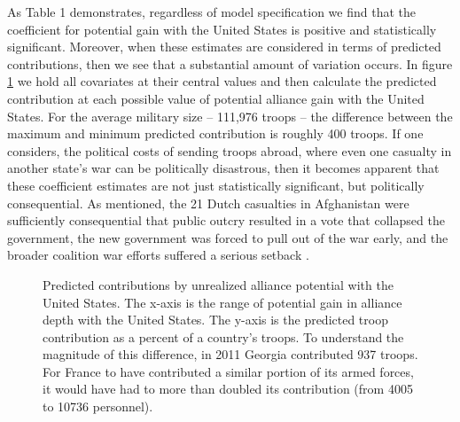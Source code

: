 \documentclass[12pt,letterpaper]{article}
\begin{document}
		\newpage
		
		\newpage

		As Table 1 demonstrates, regardless of model specification we find that the coefficient for potential gain with the United States is positive and statistically significant. Moreover, when these estimates are considered in terms of predicted contributions, then we see that a substantial amount of variation occurs. In figure \ref{fig:predict} we hold all covariates at their central values and then calculate the predicted contribution at each possible value of potential alliance gain with the United States. For the average military size -- 111,976 troops -- the difference between the maximum and minimum predicted contribution is roughly 400 troops. If one considers, the political costs of sending troops abroad, where even one casualty in another state's war can be politically disastrous, then it becomes apparent that these coefficient estimates are not just statistically significant, but politically consequential. As mentioned, the 21 Dutch casualties in Afghanistan were sufficiently consequential that public outcry resulted in a vote that collapsed the government, the new government was forced to pull out of the war early, and the broader coalition war efforts suffered a serious setback \citep[95-100]{massie_whydemocraticallies_2016}.

		\newpage
		\begin{figure}[ht]
			\centering
			\resizebox{1.05\linewidth}{!}{
				
			}
			\caption{Predicted contributions by unrealized alliance potential with the United States. The x-axis is the range of potential gain in alliance depth with the United States. The y-axis is the predicted troop contribution as a percent of a country's troops. To understand the magnitude of this difference, in 2011 Georgia contributed 937 troops. For France to have contributed a similar portion of its armed forces, it would have had to more than doubled its contribution (from 4005 to 10736 personnel).}
			\label{fig:predict}
		\end{figure}
		\newpage
\end{document}
